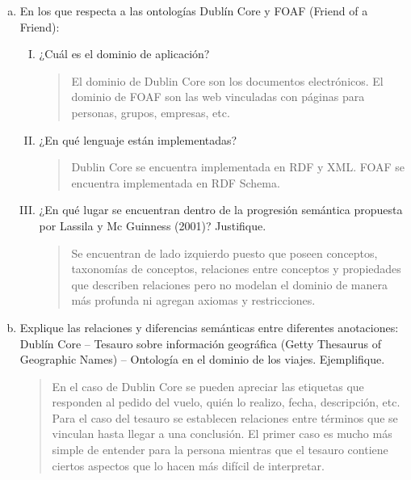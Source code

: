 \documentclass[a4paper,12pt,oneside,final,spanish]{article}
\begin{document}
\begin{enumerate}[a.]
\item  En los que respecta a las ontologías Dublín Core y FOAF (Friend 
of a Friend):
\begin{enumerate}[I.]
\item ¿Cuál es el dominio de aplicación?

\dotfill

\begin{quote}
El dominio de Dublin Core son los documentos electrónicos. El dominio de FOAF son las web vinculadas con páginas para personas, grupos, empresas, etc.
\end{quote}

\item ¿En qué lenguaje están implementadas?

\dotfill

\begin{quote}
Dublin Core se encuentra implementada en RDF y XML. FOAF se encuentra implementada en RDF Schema.
\end{quote}

\item ¿En qué lugar se encuentran dentro de la progresión semántica propuesta por Lassila y Mc Guinness (2001)? Justifique.

\dotfill

\begin{quote}
Se encuentran de lado izquierdo puesto que poseen conceptos, taxonomías de conceptos, relaciones entre conceptos y propiedades que describen relaciones pero no modelan el dominio de manera más profunda ni agregan axiomas y restricciones.
\end{quote}

\end{enumerate}
\item Explique las relaciones y diferencias semánticas entre diferentes anotaciones: Dublín Core – Tesauro sobre información geográfica (Getty Thesaurus of Geographic Names) – Ontología en el dominio de los viajes. Ejemplifique.

\dotfill

\begin{quote}
En el caso de Dublin Core se pueden apreciar las etiquetas que responden al pedido del vuelo, quién lo realizo, fecha, descripción, etc. Para el caso del tesauro se establecen relaciones entre términos que se vinculan hasta llegar a una conclusión. El primer caso es mucho más simple de entender para la persona mientras que el tesauro contiene ciertos aspectos que lo hacen más difícil de interpretar.
\end{quote}


\end{enumerate}
\end{document}
